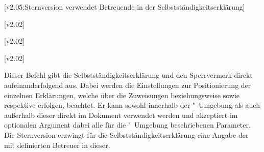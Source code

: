 \begin{DeclareEntity*}{}
\begin{DeclareEntity*}{}
\begin{DeclareEntity*}{}
\begin{Declaration}
  {}
\begin{Declaration}
  {}
  [v2.05:Sternversion verwendet Betreuende in der Selbstständigkeitserklärung]
\begin{Declaration}
  {}
\begin{Declaration}
  {}
  [v2.02]
\begin{Declaration}
  {}
  [v2.02]
\begin{Declaration}
  {}
  [v2.02]
\begin{Declaration}
  {}
\begin{Declaration}
  {}
\begin{Declaration}
  {}
\begin{Declaration}
  {}
\begin{Declaration}
  {}
\printdeclarationlist
%
Dieser Befehl gibt die Selbstständigkeitserklärung und den Sperrvermerk direkt 
aufeinanderfolgend aus. Dabei werden die Einstellungen zur Positionierung der 
einzelnen Erklärungen, welche über die Zuweisungen  
beziehungsweise  sowie  
respektive  erfolgen, beachtet. Er kann sowohl 
innerhalb der "~Umgebung als auch außerhalb dieser 
direkt im Dokument verwendet werden und akzeptiert im optionalen Argument dabei 
alle für die "~Umgebung beschriebenen Parameter. 
%
Die Sternversion erzwingt für die Selbstständigkeitserklärung eine Angabe der 
mit  definierten Betreuer in dieser.
\end{Declaration}
\end{Declaration}
\end{Declaration}
\end{Declaration}
\end{Declaration}
\end{Declaration}
\end{Declaration}
\end{Declaration}
\end{Declaration}
\end{Declaration}
\end{Declaration}


\end{DeclareEntity*}
\end{DeclareEntity*}
\end{DeclareEntity*}
